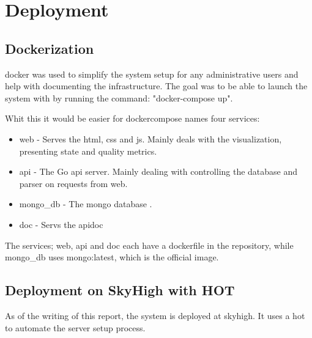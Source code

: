 
\chapter{Deployment}
\label{chap:deployment}

\section{Dockerization}

\Gls{docker} was used to simplify the system setup for any administrative users and help with documenting the infrastructure. The goal was to be able to launch the system with by running the command: "docker-compose up".

Whit this it would be easier for 
\Gls{dockercompose} names four services:
\begin{itemize}
    \item web - Serves the \gls{html}, \gls{css} and \gls{js}. Mainly deals with the visualization, presenting state and quality metrics.
    \item api - The Go \gls{api} server. Mainly dealing with controlling the database and parser on requests from web. 
    \item mongo\_db - The \gls{mongo} database \cite{mongodb}.
    \item doc - Servs the \gls{apidoc} 
\end{itemize}

The services; web, api and doc each have a \gls{dockerfile} in the repository, while mongo\_db uses mongo:latest, which is the official image. 

\section{Deployment on SkyHigh with HOT}

As of the writing of this report, the system is deployed at \gls{skyhigh}.
It uses a \gls{hot} to automate the server setup process. 